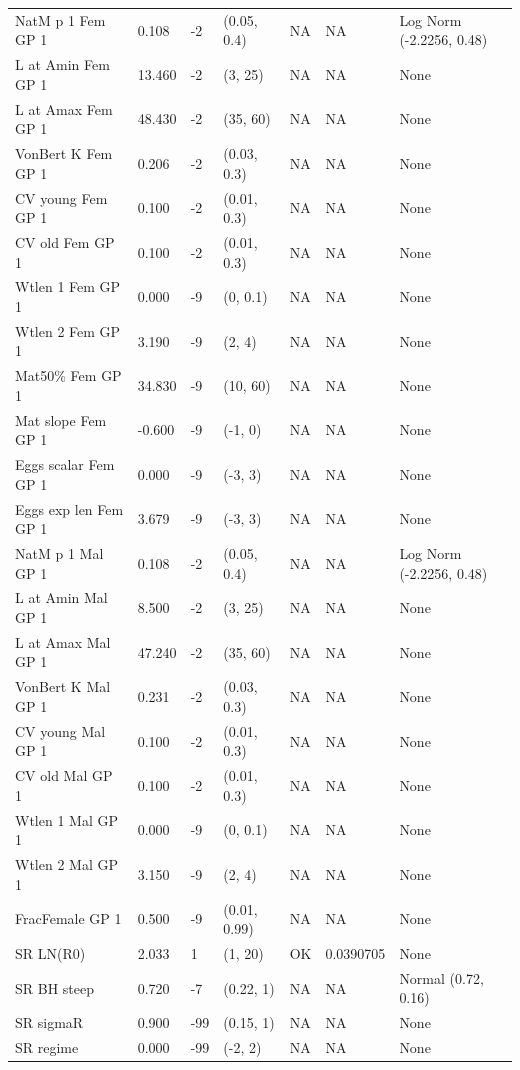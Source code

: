 \documentclass[11pt,
  english,
  a4paper,
]{article}
\begin{document}
\begin{landscape}
\begin{longtable}[t]{>{\raggedright\arraybackslash}p{6cm}lllll>{\raggedright\arraybackslash}p{4cm}}
\endfoot
\bottomrule
\endlastfoot
NatM p 1 Fem GP 1 & 0.108 & -2 & (0.05, 0.4) & NA & NA & Log Norm (-2.2256, 0.48)\\
L at Amin Fem GP 1 & 13.460 & -2 & (3, 25) & NA & NA & None\\
L at Amax Fem GP 1 & 48.430 & -2 & (35, 60) & NA & NA & None\\
VonBert K Fem GP 1 & 0.206 & -2 & (0.03, 0.3) & NA & NA & None\\
CV young Fem GP 1 & 0.100 & -2 & (0.01, 0.3) & NA & NA & None\\
CV old Fem GP 1 & 0.100 & -2 & (0.01, 0.3) & NA & NA & None\\
Wtlen 1 Fem GP 1 & 0.000 & -9 & (0, 0.1) & NA & NA & None\\
Wtlen 2 Fem GP 1 & 3.190 & -9 & (2, 4) & NA & NA & None\\
Mat50\% Fem GP 1 & 34.830 & -9 & (10, 60) & NA & NA & None\\
Mat slope Fem GP 1 & -0.600 & -9 & (-1, 0) & NA & NA & None\\
Eggs scalar Fem GP 1 & 0.000 & -9 & (-3, 3) & NA & NA & None\\
Eggs exp len Fem GP 1 & 3.679 & -9 & (-3, 3) & NA & NA & None\\
NatM p 1 Mal GP 1 & 0.108 & -2 & (0.05, 0.4) & NA & NA & Log Norm (-2.2256, 0.48)\\
L at Amin Mal GP 1 & 8.500 & -2 & (3, 25) & NA & NA & None\\
L at Amax Mal GP 1 & 47.240 & -2 & (35, 60) & NA & NA & None\\
VonBert K Mal GP 1 & 0.231 & -2 & (0.03, 0.3) & NA & NA & None\\
CV young Mal GP 1 & 0.100 & -2 & (0.01, 0.3) & NA & NA & None\\
CV old Mal GP 1 & 0.100 & -2 & (0.01, 0.3) & NA & NA & None\\
Wtlen 1 Mal GP 1 & 0.000 & -9 & (0, 0.1) & NA & NA & None\\
Wtlen 2 Mal GP 1 & 3.150 & -9 & (2, 4) & NA & NA & None\\
FracFemale GP 1 & 0.500 & -9 & (0.01, 0.99) & NA & NA & None\\
SR LN(R0) & 2.033 & 1 & (1, 20) & OK & 0.0390705 & None\\
SR BH steep & 0.720 & -7 & (0.22, 1) & NA & NA & Normal (0.72, 0.16)\\
SR sigmaR & 0.900 & -99 & (0.15, 1) & NA & NA & None\\
SR regime & 0.000 & -99 & (-2, 2) & NA & NA & None\\

\end{longtable}
\end{landscape}
\end{document}
